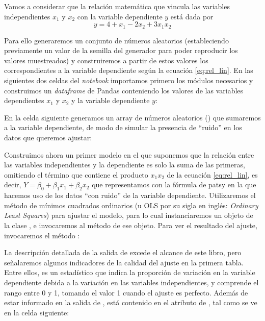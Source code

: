 Vamos a considerar que la relación matemática que vincula las variables independientes $x_1$ y $x_2$ con la variable dependiente $y$ está dada por 
\begin{equation} \label{eq:rel_lin}
y = 4 + x_1 - 2 x_2 + 3 x_1 x_2
 \end{equation}

Para ello generaremos un conjunto de números aleatorios (estableciendo previamente un valor de la semilla del generador para poder reproducir los valores muestreados) y construiremos a partir de estos valores los correspondientes a la variable dependiente según la ecuación \eqref{eq:rel_lin}. En las siguientes dos celdas del \textit{notebook} importamos primero los módulos necesarios y construimos un \textit{dataframe} de Pandas conteniendo los valores de las variables dependientes $x_1$ y $x_2$ y la variable dependiente $y$:


En la celda siguiente generamos un array de números aleatorios () que sumaremos a la variable dependiente, de modo de simular la presencia de ``ruido'' en los datos que queremos ajustar:


Construimos ahora un primer modelo en el que suponemos que la relación entre las variables independientes y la dependiente es solo la suma de las primeras, omitiendo el término que contiene el producto $x_1 x_2$ de la ecuación \eqref{eq:rel_lin}, es decir, $Y = \beta_0 + \beta_1 x_1 + \beta_2 x_2$ que representamos con la fórmula de patsy  en la que hacemos uso de los datos ``con ruido'' de la variable dependiente. Utilizaremos el método de mínimos cuadrados ordinarios (u OLS por su sigla en inglés: \textit{Ordinary Least Squares}) para ajustar el modelo, para lo cual instanciaremos un objeto  de la clase , e invocaremos al método  de ese objeto. Para ver el resultado del ajuste, invocaremos el método :


La descripción detallada de la salida de  excede el alcance de este libro, pero señalaremos algunos indicadores de la calidad del ajuste en la primera tabla. Entre ellos,  es un estadístico que indica la proporción de variación en la variable dependiente debida a la variación en las variables independientes, y comprende el rango entre 0 y 1, tomando el valor 1 cuando el ajuste es perfecto. Además de estar informado en la salida de , está contenido en el atributo  de , tal como se ve en la celda siguiente:


